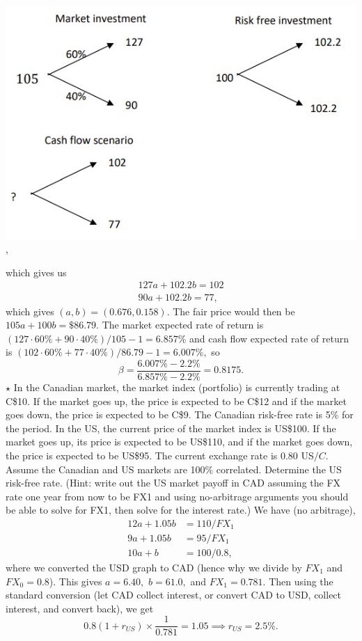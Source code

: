 \documentclass[11pt,landscape]{article}
\begin{document}
\begin{multicols*}{3}
\begin{center}
    \includegraphics[width=0.8\linewidth]{risk.jpg},
\end{center}
which gives us 
\begin{align*}
    127a + 102.2b = 102 \\ 
    90a +  102.2b = 77,
\end{align*}
which gives $(a,b)=(0.676,0.158).$ The fair price would then be $105a+100b=\$86.79.$ The market expected rate of return is $(127 \cdot 60\% + 90 \cdot 40\%)/105 - 1 = 6.857\%$ and cash flow expected rate of return is $(102\cdot 60\% + 77 \cdot 40\%)/86.79 - 1 = 6.007\%,$ so $$\beta = \frac{6.007\% - 2.2\%}{6.857\% - 2.2\%} = 0.8175.$$ 
$\star$ In the Canadian market, the market index (portfolio) is currently trading at C\$10. If the market goes up, the price is expected to be C\$12 and if the market goes down, the price is expected to be C\$9. The Canadian risk-free rate is 5\% for the period. In the US, the current price of the market index is US\$100. If the market goes up, its price is expected to be US\$110, and if the market goes down, the price is expected to be US\$95. The current exchange rate is 0.80 US$/C$. Assume the Canadian and US markets are 100\% correlated. Determine the US risk-free rate. (Hint: write out the US market payoff in CAD assuming the FX rate one year from now to be FX1 and using no-arbitrage arguments you should be able to solve for FX1, then solve for the interest rate.) We have (no arbitrage),
\begin{align*}
    12a + 1.05b &= 110/FX_1 \\
    9a + 1.05b &= 95/FX_1 \\ 
    10a + b &= 100/0.8, 
\end{align*}
where we converted the USD graph to CAD (hence why we divide by $FX_1$ and $FX_0=0.8$). This gives $a=6.40,$ $b=61.0,$ and $FX_1=0.781.$ Then using the standard conversion (let CAD collect interest, or convert CAD to USD, collect interest, and convert back), we get 
\begin{equation*}
    0.8(1+r_{US}) \times \frac{1}{0.781} = 1.05 \implies r_{US} = 2.5\%.
\end{equation*}
\end{multicols*}
\end{document}
